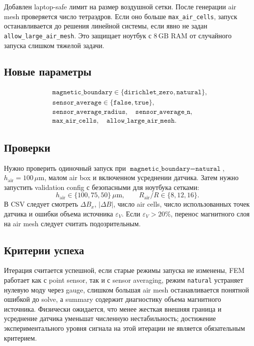 \documentclass[12pt,a4paper]{article}
\begin{document}
Добавлен laptop-safe лимит на размер воздушной сетки. После генерации air mesh
проверяется число тетраэдров. Если оно больше \texttt{max\_air\_cells}, запуск
останавливается до решения линейной системы, если явно не задан
\texttt{allow\_large\_air\_mesh}. Это защищает ноутбук с \(8\,\mathrm{GB}\) RAM
от случайного запуска слишком тяжелой задачи.

\subsection*{Новые параметры}

\[
\begin{aligned}
&\texttt{magnetic\_boundary}\in\{\texttt{dirichlet\_zero},\texttt{natural}\},\\
&\texttt{sensor\_average}\in\{\texttt{false},\texttt{true}\},\\
&\texttt{sensor\_average\_radius},\quad
\texttt{sensor\_average\_n},\\
&\texttt{max\_air\_cells},\quad
\texttt{allow\_large\_air\_mesh}.
\end{aligned}
\]

\subsection*{Проверки}

Нужно проверить одиночный запуск при
\(\texttt{magnetic\_boundary}=\texttt{natural}\), \(h_{\mathrm{air}}=100\,\mu
\mathrm{m}\), малом air box и включенном усреднении датчика. Затем нужно
запустить validation config с безопасными для ноутбука сетками:
\[
    h_{\mathrm{air}} \in \{100,75,50\}\,\mu\mathrm{m},
    \qquad
    R_{\mathrm{air}}/R \in \{8,12,16\}.
\]
В CSV следует смотреть \(\Delta B_x\), \(|\Delta B|\), число air cells,
число использованных точек датчика и ошибки объема источника
\(\varepsilon_V\). Если \(\varepsilon_V>20\%\), перенос магнитного слоя на
air mesh следует считать подозрительным.

\subsection*{Критерии успеха}

Итерация считается успешной, если старые режимы запуска не изменены, FEM
работает как с point sensor, так и с sensor averaging, режим \texttt{natural}
устраняет нулевую моду через gauge, слишком большая air mesh останавливается
понятной ошибкой до solve, а summary содержит диагностику объема магнитного
источника. Физически ожидается, что менее жесткая внешняя граница и усреднение
датчика уменьшат численную нестабильность; достижение экспериментального уровня
сигнала на этой итерации не является обязательным критерием.
\end{document}
